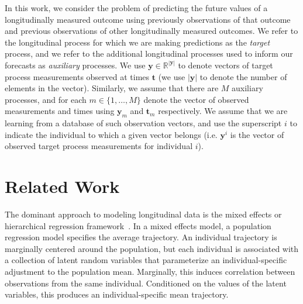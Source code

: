 \documentclass[12pt]{article}
\newcommand{\R}{\mathbb{R}}
\begin{document}
In this work, we consider the problem of predicting the future values of a longitudinally measured outcome using previously observations of that outcome and previous observations of other longitudinally measured outcomes. We refer to the longitudinal process for which we are making predictions as the \emph{target} process, and we refer to the additional longitudinal processes used to inform our forecasts as \emph{auxiliary} processes. We use $\bm{y} \in \R^{|\bm{y}|}$ to denote vectors of target process measurements observed at times $\bm{t}$ (we use $|\bm{y}|$ to denote the number of elements in the vector). Similarly, we assume that there are $M$ auxiliary processes, and for each $m \in \{1, \ldots, M\}$ denote the vector of observed measurements and times using $\bm{y}_m$ and $\bm{t}_m$ respectively. We assume that we are learning from a database of such observation vectors, and use the superscript $i$ to indicate the individual to which a given vector belongs (i.e. $\bm{y}^i$ is the vector of observed target process measurements for individual $i$).

\section{Related Work}

The dominant approach to modeling longitudinal data is the mixed effects or hierarchical regression framework~\cite{Diggle2002-tt}. In a mixed effects model, a population regression model specifies the average trajectory. An individual trajectory is marginally centered around the population, but each individual is associated with a collection of latent random variables that parameterize an individual-specific adjustment to the population mean. Marginally, this induces correlation between observations from the same individual. Conditioned on the values of the latent variables, this produces an individual-specific mean trajectory.
\end{document}
